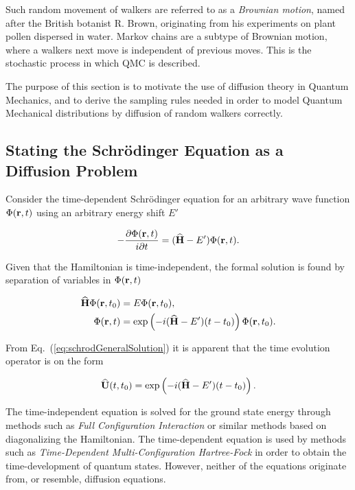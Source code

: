 Such random movement of walkers are referred to as a \textit{Brownian motion}, named after the British botanist R. Brown, originating from his experiments on plant pollen dispersed in water. Markov chains are a subtype of Brownian motion, where a walkers next move is independent of previous moves. This is the stochastic process in which QMC is described.

The purpose of this section is to motivate the use of diffusion theory in Quantum Mechanics, and to derive the sampling rules needed in order to model Quantum Mechanical distributions by diffusion of random walkers correctly. 

\subsection{Stating the Schrödinger Equation as a Diffusion Problem}
\label{sec:statingDiff}

Consider the time-dependent Schrödinger equation for an arbitrary wave function $\Phi(\mathbf{r}, t)$ using an arbitrary energy shift $E'$

\begin{equation}
 -\frac{\partial \Phi(\mathbf{r}, t)}{i\partial t} = ({\bf\widehat{H}} - E')\Phi(\mathbf{r}, t).
\end{equation}

Given that the Hamiltonian is time-independent, the formal solution is found by separation of variables in $\Phi(\mathbf{r}, t)$ \cite{griffiths}

\begin{align}
 {\bf\widehat{H}}\Phi(\mathbf{r}, t_0) &= E\Phi(\mathbf{r}, t_0), \label{eq:schrodTimeIndie}\\
 \Phi(\mathbf{r}, t) &= \exp\left(-i({\bf\widehat{H}} - E')(t-t_0)\right)\Phi(\mathbf{r}, t_0). \label{eq:schrodGeneralSolution}
\end{align}

From Eq.~(\ref{eq:schrodGeneralSolution}) it is apparent that the time evolution operator is on the form

\begin{equation}
 {\bf\widehat{U}}(t, t_0) = \exp\left(-i({\bf\widehat{H}} - E')(t-t_0)\right). \label{eq:TimeEvolOp}
\end{equation}


The time-independent equation is solved for the ground state energy through methods such as \textit{Full Configuration Interaction} \cite{Shavitt} or similar methods based on diagonalizing the Hamiltonian. The time-dependent equation is used by methods such as \textit{Time-Dependent Multi-Configuration Hartree-Fock} \cite{Sigve} in order to obtain the time-development of quantum states. However, neither of the equations originate from, or resemble, diffusion equations. 

